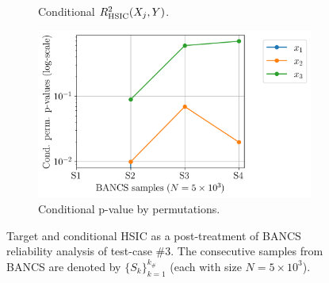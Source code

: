 \begin{figure}
\begin{subfigure}[b]{0.4\linewidth}
        \caption{Conditional $R^2_{\mathrm{HSIC}}(X_j, Y)$.}
    \end{subfigure}
    \begin{subfigure}[b]{0.4\linewidth}
        \centering
        \includegraphics[width=\linewidth]{part3/figures/BANCS/ishigami_Cpvalue_permutation.png}
        \caption{Conditional p-value by permutations.}
    \end{subfigure}
    \caption{Target and conditional HSIC as a post-treatment of BANCS reliability analysis of test-case \#3. 
                The consecutive samples from BANCS are denoted by $\{S_k\}_{k=1}^{k_\#}$ (each with size $N=5\times10^3$).}
    \label{fig:rosa_ishigami}
\end{figure}


